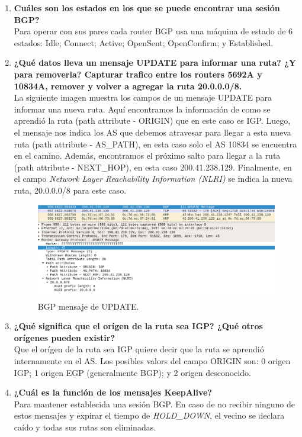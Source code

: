 \documentclass[letterpaper,12pt]{article}
\begin{document}
\begin{enumerate}
		\item \textbf{Cuáles son los estados en los que se puede encontrar una sesión BGP?}\\
		Para operar con sus pares cada router BGP usa una máquina de estado de 6 estados: Idle; Connect; Active; OpenSent; OpenConfirm; y Established.
	
		\item \textbf{¿Qué datos lleva un mensaje UPDATE para informar una ruta? ¿Y para removerla? Capturar trafico entre los routers 5692A y 10834A, remover y volver a agregar la ruta 20.0.0.0/8.}\\
		La siguiente imagen muestra los campos de un mensaje UPDATE para informar una nueva ruta. Aquí encontramos la información de como se aprendió la ruta (path attribute - ORIGIN) que en este caso es IGP. Luego, el mensaje nos indica los AS que debemos atravesar para llegar a esta nueva ruta (path attribute - AS\_PATH), en esta caso solo el AS 10834 se encuentra en el camino. Además, encontramos el próximo salto para llegar a la ruta (path attribute - NEXT\_HOP), en esta caso 200.41.238.129. Finalmente, en el campo \textit{Network Layer Reachability Information (NLRI)} se indica la nueva ruta, 20.0.0.0/8 para este caso.

		\begin{figure}[H]
			\centering \includegraphics[width=1\columnwidth]{figure/bgp-update.png}
			\caption{
				\label{fig:samplesetup} %
				BGP mensaje de UPDATE.
			}
		\end{figure}
		
		\item \textbf{¿Qué significa que el orígen de la ruta sea IGP? ¿Qué otros orígenes pueden existir?}\\
		Que el orígen de la ruta sea IGP quiere decir que la ruta se aprendió internamente en el AS. Los posibles valors del campo ORIGIN son: 0 origen IGP; 1 origen EGP (generalmente BGP); y 2 origen desconocido. 
		
		\item \textbf{¿Cuál es la función de los mensajes KeepAlive?}\\
		Para mantener establecida una sesión BGP. En caso de no recibir ninguno de estos mensajes y expirar el tiempo de \textit{HOLD\_DOWN}, el vecino se declara caído y todas sus rutas son eliminadas.
		

\end{enumerate}
\end{document}
